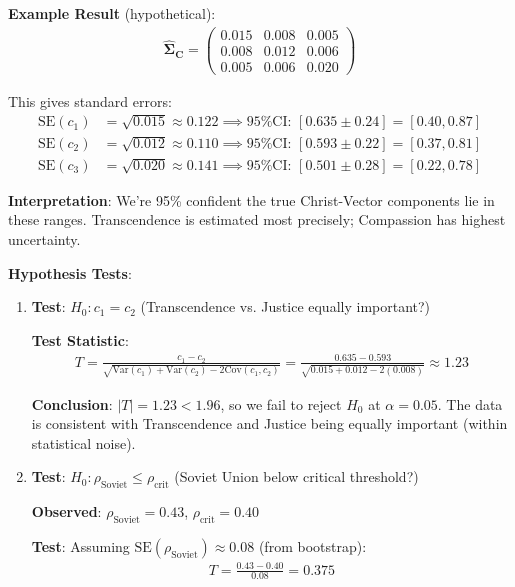 \documentclass[11pt,a4paper]{article}
\theoremstyle{definition}
\theoremstyle{remark}
\begin{document}
\begin{small}
\textbf{Example Result} (hypothetical):
\begin{align}
\hat{\boldsymbol{\Sigma}}_{\mathbf{C}} = \begin{pmatrix}
0.015 & 0.008 & 0.005 \\
0.008 & 0.012 & 0.006 \\
0.005 & 0.006 & 0.020
\end{pmatrix}
\end{align}

This gives standard errors:
\begin{align}
\text{SE}(c_1) &= \sqrt{0.015} \approx 0.122 \implies \text{95\% CI: } [0.635 \pm 0.24] = [0.40, 0.87] \\
\text{SE}(c_2) &= \sqrt{0.012} \approx 0.110 \implies \text{95\% CI: } [0.593 \pm 0.22] = [0.37, 0.81] \\
\text{SE}(c_3) &= \sqrt{0.020} \approx 0.141 \implies \text{95\% CI: } [0.501 \pm 0.28] = [0.22, 0.78]
\end{align}

\textbf{Interpretation}: We're 95\% confident the true Christ-Vector components lie in these ranges. Transcendence is estimated most precisely; Compassion has highest uncertainty.

\textbf{Hypothesis Tests}:

\begin{enumerate}
\item \textbf{Test}: \(H_0: c_1 = c_2\) (Transcendence vs. Justice equally important?)

\textbf{Test Statistic}:
\begin{align}
T = \frac{c_1 - c_2}{\sqrt{\text{Var}(c_1) + \text{Var}(c_2) - 2\text{Cov}(c_1, c_2)}} = \frac{0.635 - 0.593}{\sqrt{0.015 + 0.012 - 2(0.008)}} \approx 1.23
\end{align}

\textbf{Conclusion}: \(|T| = 1.23 < 1.96\), so we fail to reject \(H_0\) at \(\alpha = 0.05\). The data is consistent with Transcendence and Justice being equally important (within statistical noise).

\item \textbf{Test}: \(H_0: \rho_{\text{Soviet}} \leq \rho_{\text{crit}}\) (Soviet Union below critical threshold?)

\textbf{Observed}: \(\rho_{\text{Soviet}} = 0.43\), \(\rho_{\text{crit}} = 0.40\)

\textbf{Test}: Assuming \(\text{SE}(\rho_{\text{Soviet}}) \approx 0.08\) (from bootstrap):
\begin{align}
T = \frac{0.43 - 0.40}{0.08} = 0.375
\end{align}


\end{enumerate}
\end{small}
\end{document}
